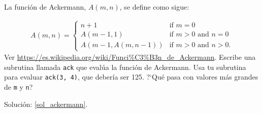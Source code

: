 \begin{exercise}
\label{ackermann}

La función de Ackermann, $A(m, n)$, se define como sigue:

\begin{eqnarray*}
A(m, n) = \begin{cases} 
              n+1 & \mbox{if } m = 0 \\ 
        A(m-1, 1) & \mbox{if } m > 0 \mbox{ and } n = 0 \\ 
A(m-1, A(m, n-1)) & \mbox{if } m > 0 \mbox{ and } n > 0.
\end{cases} 
\end{eqnarray*}
%
Ver \url{https://es.wikipedia.org/wiki/Funci%C3%B3n_de_Ackermann}.
Escribe una subrutina llamada {\tt ack} que evalúa la función de Ackermann.
Usa tu subrutina para evaluar {\tt ack(3, 4)}, que debería ser 125. 
?`Qué pasa con valores más grandes de {\tt m} y {\tt n}?

Solución: \ref{sol_ackermann}.

\end{exercise}


